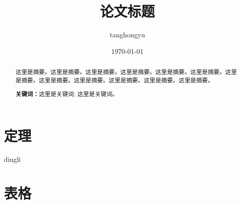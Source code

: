 \documentclass[12pt, a4paper, oneside]{ctexart}
\title{\textbf{论文标题}}
\author{tanghongyu}
\date{\today}
\newtheorem{theorem}{定理}[section]
\begin{document}
\maketitle

\setcounter{page}{0}
\maketitle
\thispagestyle{empty}
\newpage
\begin{abstract}
    这里是摘要。这里是摘要。这里是摘要。这里是摘要。这里是摘要。这里是摘要。这里是摘要。这里是摘要。这里是摘要。这里是摘要。这里是摘要。这里是摘要。
    \par\textbf{关键词：}这里是关键词; 这里是关键词。
\end{abstract}

\newpage
{}
\setcounter{page}{1}
\tableofcontents
\newpage
\setcounter{page}{1}

\section{定理}

dingli\cite{elgamal1985public}
\newpage




\section{表格}

\begin{table}[htbp]
    \centering  %
    \caption{ }  %
    \label{tab1}  %
    \begin{tabular}{|c|c|c|}
    \end{tabular}
\end{table}


\begin{table}[htbp]
    \centering  %
    \caption{ }  %
    \label{tab2}  %
    \begin{adjustbox}{max width=\textwidth}
        \begin{tabular}{|c|c|c|}
        \end{tabular}
    \end{adjustbox}
\end{table}
\begin{table}[htbp]
    \centering  %
    \caption{ }  %
    \label{tab111}  %
    \begin{tabular}{|c|c|}
    \end{tabular}
\end{table}
\end{document}
